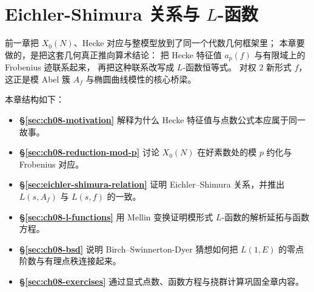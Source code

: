 \chapter{Eichler-Shimura 关系与 $L$-函数}
\label{ch:eichler-shimura}
\label{ch:eichler-shimura-l}

前一章把 $X_0(N)$、Hecke 对应与整模型放到了同一个代数几何框架里；
本章要做的，是把这套几何真正推向算术结论：
把 Hecke 特征值 $a_p(f)$ 与有限域上的 Frobenius 迹联系起来，
再把这种联系改写成 $L$-函数恒等式。
对权 $2$ 新形式 $f$，这正是模 Abel 簇 $A_f$ 与椭圆曲线模性的核心桥梁。

本章结构如下：
\begin{itemize}
  \item \textbf{§\ref{sec:ch08-motivation}} 解释为什么 Hecke 特征值与点数公式本应属于同一故事。
  \item \textbf{§\ref{sec:ch08-reduction-mod-p}} 讨论 $X_0(N)$ 在好素数处的模 $p$ 约化与 Frobenius 对应。
  \item \textbf{§\ref{sec:eichler-shimura-relation}} 证明 Eichler--Shimura 关系，并推出 $L(s,A_f)$ 与 $L(s,f)$ 的一致。
  \item \textbf{§\ref{sec:ch08-l-functions}} 用 Mellin 变换证明模形式 $L$-函数的解析延拓与函数方程。
  \item \textbf{§\ref{sec:ch08-bsd}} 说明 Birch--Swinnerton-Dyer 猜想如何把 $L(1,E)$ 的零点阶数与有理点秩连接起来。
  \item \textbf{§\ref{sec:ch08-exercises}} 通过显式点数、函数方程与挠群计算巩固全章内容。
\end{itemize}







